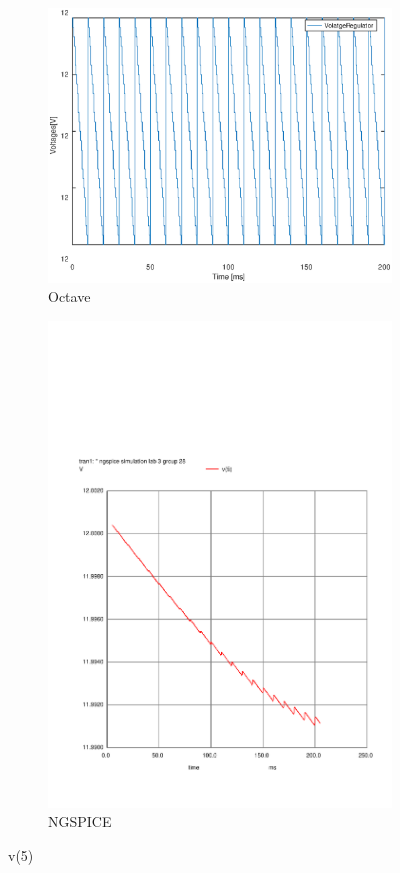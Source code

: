 \begin{figure}[H] 
\centering
\begin{subfigure}{0.4\textwidth}
\includegraphics[width=\textwidth]{VoltageRegulator.eps}
\caption{Octave}
\label{fig:first}
\end{subfigure}
\begin{subfigure}{0.3\textwidth}
\includegraphics[width=\textwidth]{sim33.pdf}
\caption{NGSPICE}
\label{fig:second}
\end{subfigure}
\caption{v(5)}
\end{figure}
